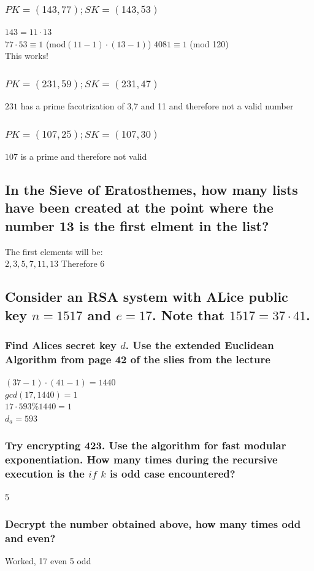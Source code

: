 \documentclass[12pt, a4paper]{article}
\begin{document}
		\subsubsection{$PK=(143,77);SK=(143,53)$}
			$143=11\cdot 13$\\
			$77\cdot 53\equiv 1$ (mod$(11-1)\cdot (13-1)$)
			$4081\equiv 1$ (mod 120)\\
			This works!
		\subsubsection{$PK=(231,59);SK=(231,47)$}
			$231$ has a prime facotrization of 3,7 and 11 and therefore not a valid number
		\subsubsection{$PK=(107,25);SK=(107,30)$}
			$107$ is a prime and therefore not valid
	\subsection{In the Sieve of Eratosthemes, how many lists have been created at the point where the number 13 is the first elment in the list?}
			The first elements will be:\\
			$2,3,5,7,11,13$
			Therefore 6
	\subsection{Consider an RSA system with ALice public key $n=1517$ and $e=17$. Note that $1517=37\cdot 41$.}
		\subsubsection{Find Alices secret key $d$. Use the extended Euclidean Algorithm from page 42 of the slies from the lecture}
			$(37-1)\cdot(41-1)=1440$\\
			$gcd(17,1440)=1$\\
			$17\cdot 593\%1440=1$\\
			$d_a=593$
		\subsubsection{Try encrypting 423. Use the algorithm for fast modular exponentiation. How many times during the recursive execution is the $if$ $k$ is odd case encountered?}
			5
		\subsubsection{Decrypt the number obtained above, how many times odd and even?}
			Worked, 17 even 5 odd
\end{document}

